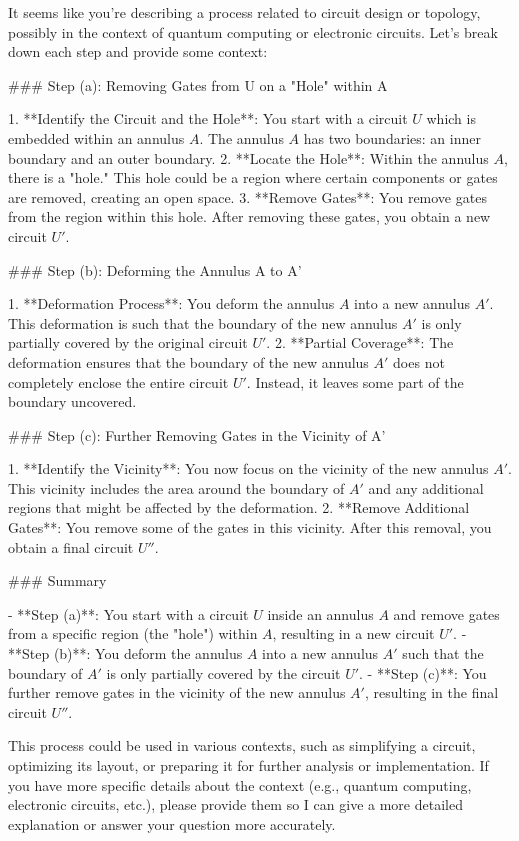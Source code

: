 It seems like you're describing a process related to circuit design or topology, possibly in the context of quantum computing or electronic circuits. Let's break down each step and provide some context:

### Step (a): Removing Gates from U on a "Hole" within A

1. **Identify the Circuit and the Hole**: You start with a circuit \( U \) which is embedded within an annulus \( A \). The annulus \( A \) has two boundaries: an inner boundary and an outer boundary.
2. **Locate the Hole**: Within the annulus \( A \), there is a "hole." This hole could be a region where certain components or gates are removed, creating an open space.
3. **Remove Gates**: You remove gates from the region within this hole. After removing these gates, you obtain a new circuit \( U' \).

### Step (b): Deforming the Annulus A to A'

1. **Deformation Process**: You deform the annulus \( A \) into a new annulus \( A' \). This deformation is such that the boundary of the new annulus \( A' \) is only partially covered by the original circuit \( U' \).
2. **Partial Coverage**: The deformation ensures that the boundary of the new annulus \( A' \) does not completely enclose the entire circuit \( U' \). Instead, it leaves some part of the boundary uncovered.

### Step (c): Further Removing Gates in the Vicinity of A'

1. **Identify the Vicinity**: You now focus on the vicinity of the new annulus \( A' \). This vicinity includes the area around the boundary of \( A' \) and any additional regions that might be affected by the deformation.
2. **Remove Additional Gates**: You remove some of the gates in this vicinity. After this removal, you obtain a final circuit \( U'' \).

### Summary

- **Step (a)**: You start with a circuit \( U \) inside an annulus \( A \) and remove gates from a specific region (the "hole") within \( A \), resulting in a new circuit \( U' \).
- **Step (b)**: You deform the annulus \( A \) into a new annulus \( A' \) such that the boundary of \( A' \) is only partially covered by the circuit \( U' \).
- **Step (c)**: You further remove gates in the vicinity of the new annulus \( A' \), resulting in the final circuit \( U'' \).

This process could be used in various contexts, such as simplifying a circuit, optimizing its layout, or preparing it for further analysis or implementation. If you have more specific details about the context (e.g., quantum computing, electronic circuits, etc.), please provide them so I can give a more detailed explanation or answer your question more accurately.